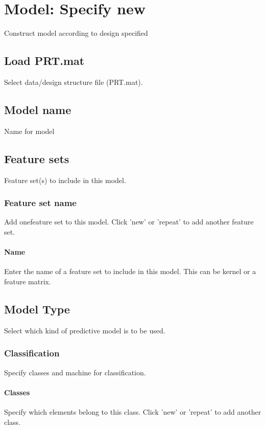 
\chapter{Model: Specify new  \label{Chap:model}}

\vskip 1.5cm

Construct model according to design specified


\section{Load PRT.mat}
Select data/design structure file (PRT.mat).


\section{Model name}
Name for model


\section{Feature sets}
Feature set(s) to include in this model.


\subsection{Feature set name}
Add onefeature set to this model. Click 'new' or 'repeat' to add another feature set.


\subsubsection{Name}
Enter the name of a feature set to include in this model. This can be kernel or a feature matrix. 


\section{Model Type }
Select which kind of predictive model is to be used.


\subsection{Classification}
Specify classes and machine for classification.


\subsubsection{Classes}
Specify which elements belong to this class. Click 'new' or 'repeat' to add another class.


